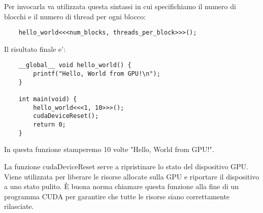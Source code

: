 Per invocarla va utilizzata questa sintassi in cui specifichiamo il numero di blocchi e il numero di thread per ogni blocco:
\begin{lstlisting}
    hello_world<<<num_blocks, threads_per_block>>>();
\end{lstlisting}

Il risultato finale e':
\begin{lstlisting}
    __global__ void hello_world() {
        printf("Hello, World from GPU!\n");
    }

    int main(void) {
        hello_world<<<1, 10>>>();
        cudaDeviceReset();
        return 0;
    }
\end{lstlisting}

In questa funzione stamperemo 10 volte "Hello, World from GPU!".

La funzione cudaDeviceReset serve a ripristinare lo stato del dispositivo GPU. Viene utilizzata per liberare le risorse allocate sulla GPU e riportare il dispositivo a uno stato pulito. È buona norma chiamare questa funzione alla fine di un programma CUDA per garantire che tutte le risorse siano correttamente rilasciate.